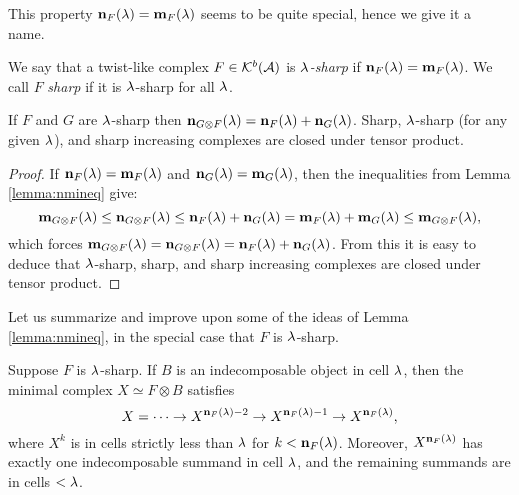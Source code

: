 This property ${\mathbf n}_F(\lambda)={\mathbf m}_F(\lambda)$ seems to be quite special, hence we give it a name.

\begin{definition}\label{def:lsharp}
We say that a twist-like complex $F\in {\mathcal{K}}^b({\mathcal{A}})$ is \emph{$\lambda$-sharp} if ${\mathbf n}_F(\lambda)={\mathbf m}_F(\lambda)$.  We call $F$ \emph{sharp} if it is $\lambda$-sharp for all $\lambda$.
\end{definition}



\begin{lemma} \label{lem:sharptensorclosed} If $F$ and $G$ are $\lambda$-sharp then ${\mathbf n}_{G \otimes F}(\lambda) = {\mathbf n}_F(\lambda) + {\mathbf n}_G(\lambda)$. Sharp, $\lambda$-sharp (for any given $\lambda$), and sharp increasing complexes are closed under tensor product. %
\end{lemma}

\begin{proof} If ${\mathbf n}_F(\lambda)={\mathbf m}_F(\lambda)$ and ${\mathbf n}_G(\lambda)={\mathbf m}_G(\lambda)$, then the inequalities from Lemma \ref{lemma:nmineq} give:
\[
{\mathbf m}_{G\otimes F}(\lambda) \leq {\mathbf n}_{G\otimes F}(\lambda)\leq  {\mathbf n}_F(\lambda) +{\mathbf n}_G(\lambda) = {\mathbf m}_F(\lambda) + {\mathbf m}_G(\lambda) \leq {\mathbf m}_{G\otimes F}(\lambda),
\]
which forces ${\mathbf m}_{G\otimes F}(\lambda) = {\mathbf n}_{G\otimes F}(\lambda) = {\mathbf n}_F(\lambda) + {\mathbf n}_G(\lambda)$. From this it is easy to deduce that $\lambda$-sharp, sharp, and sharp increasing complexes are closed under tensor product.
\end{proof}



Let us summarize and improve upon some of the ideas of Lemma \ref{lemma:nmineq}, in the special case that $F$ is $\lambda$-sharp.

\begin{lemma}\label{lemma:tail1}
Suppose $F$ is $\lambda$-sharp.  If $B$ is an indecomposable object in cell $\lambda$, then the minimal complex $X\simeq F\otimes B$ satisfies
\[
X = \cdots \rightarrow X^{{\mathbf n}_F(\lambda)-2}  \rightarrow X^{{\mathbf n}_F(\lambda)-1}  \rightarrow X^{{\mathbf n}_F(\lambda)},
\]
where $X^k$ is in cells strictly less than $\lambda$ for $k< {\mathbf n}_F(\lambda)$. Moreover, $X^{{\mathbf n}_F(\lambda)}$ has exactly one indecomposable summand in cell $\lambda$, and the remaining summands are in cells $< \lambda$.
\end{lemma}

